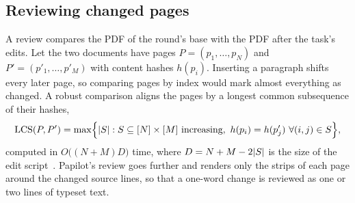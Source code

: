 \subsection{Reviewing changed pages}

A review compares the PDF of the round's base with the PDF after the task's
edits. Let the two documents have pages $P = (p_1, \dots, p_N)$ and
$P' = (p'_1, \dots, p'_M)$ with content hashes $h(p_i)$. Inserting a paragraph
shifts every later page, so comparing pages by index would mark almost
everything as changed. A robust comparison aligns the pages by a longest common
subsequence of their hashes,
\begin{equation}
  \operatorname{LCS}(P, P') = \max\Bigl\{ \lvert S\rvert : S \subseteq [N]\times[M]
  \text{ increasing},\ h(p_i) = h(p'_j)\ \forall (i,j) \in S \Bigr\},
\end{equation}
computed in $O\bigl((N + M) D\bigr)$ time, where $D = N + M - 2\lvert S\rvert$ is the
size of the edit script~\cite{myers1986}. Papilot's review goes further and
renders only the strips of each page around the changed source lines, so that
a one-word change is reviewed as one or two lines of typeset text.
